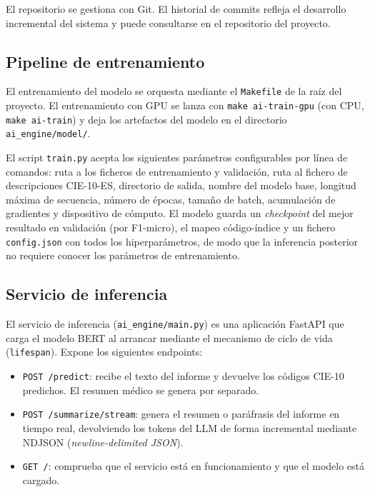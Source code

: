 El repositorio se gestiona con Git. El historial de commits refleja el desarrollo incremental del sistema y puede consultarse en el repositorio del proyecto.

\subsection{Pipeline de entrenamiento}

El entrenamiento del modelo se orquesta mediante el \texttt{Makefile} de la raíz del proyecto. El entrenamiento con GPU se lanza con \texttt{make ai-train-gpu} (con CPU, \texttt{make ai-train}) y deja los artefactos del modelo en el directorio \texttt{ai\_engine/model/}.

El script \texttt{train.py} acepta los siguientes parámetros configurables por línea de comandos: ruta a los ficheros de entrenamiento y validación, ruta al fichero de descripciones CIE-10-ES, directorio de salida, nombre del modelo base, longitud máxima de secuencia, número de épocas, tamaño de batch, acumulación de gradientes y dispositivo de cómputo. El modelo guarda un \emph{checkpoint} del mejor resultado en validación (por F1-micro), el mapeo código-índice y un fichero \texttt{config.json} con todos los hiperparámetros, de modo que la inferencia posterior no requiere conocer los parámetros de entrenamiento.

\subsection{Servicio de inferencia}

El servicio de inferencia (\texttt{ai\_engine/main.py}) es una aplicación FastAPI que carga el modelo BERT al arrancar mediante el mecanismo de ciclo de vida (\texttt{lifespan}). Expone los siguientes endpoints:

\begin{itemize}
 \item \texttt{POST /predict}: recibe el texto del informe y devuelve los códigos CIE-10 predichos. El resumen médico se genera por separado.
 \item \texttt{POST /summarize/stream}: genera el resumen o paráfrasis del informe en tiempo real, devolviendo los tokens del LLM de forma incremental mediante NDJSON (\emph{newline-delimited JSON}).
 \item \texttt{GET /}: comprueba que el servicio está en funcionamiento y que el modelo está cargado.
\end{itemize}

